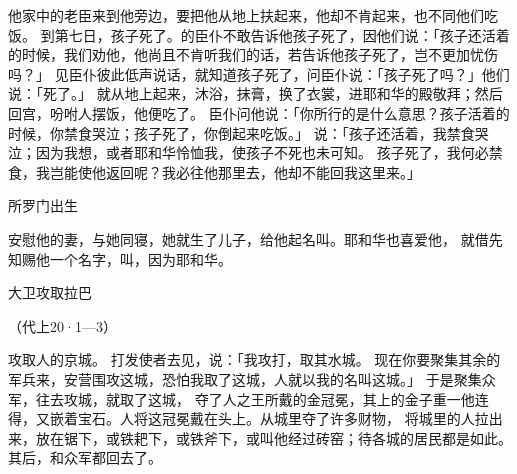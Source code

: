 {他家中的老臣来到他旁边，要把他从地上扶起来，他却不肯起来，也不同他们吃饭。
到第七日，孩子死了。{}的臣仆不敢告诉他孩子死了，因他们说：「孩子还活着的时候，我们劝他，他尚且不肯听我们的话，若告诉他孩子死了，岂不更加忧伤吗？」
见臣仆彼此低声说话，就知道孩子死了，问臣仆说：「孩子死了吗？」他们说：「死了。」
就从地上起来，沐浴，抹膏，换了衣裳，进耶和华的殿敬拜；然后回宫，吩咐人摆饭，他便吃了。
臣仆问他说：「你所行的是什么意思？孩子活着的时候，你禁食哭泣；孩子死了，你倒起来吃饭。」
说：「孩子还活着，我禁食哭泣；因为我想，或者耶和华怜恤我，使孩子不死也未可知。
孩子死了，我何必禁食，我岂能使他返回呢？我必往他那里去，他却不能回我这里来。」
\par }{\SH 所罗门出生
\par }{\PP {}安慰他的妻{}，与她同寝，她就生了儿子，给他起名叫{}。耶和华也喜爱他，
就借先知{}赐他一个名字，叫{}，因为耶和华{}。
\par }{\SH 大卫攻取拉巴
\par }{\R （代上20·1—3）
\par }{\PP {}攻取{}人的京城{}。
打发使者去见{}，说：「我攻打{}，取其水城。
现在你要聚集其余的军兵来，安营围攻这城，恐怕我取了这城，人就以我的名叫这城。」
于是{}聚集众军，往{}去攻城，就取了这城，
夺了{}人之王所戴的金冠冕，其上的金子重一他连得，又嵌着宝石。人将这冠冕戴在{}头上。{}从城里夺了许多财物，
将城里的人拉出来，放在锯下，或铁耙下，或铁斧下，或叫他经过砖窑；{}待{}各城的居民都是如此。其后，{}和众军都回{}去了。

}
